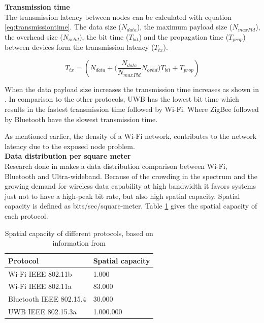 \documentclass[10pt,a4paper]{article}
\begin{document}
\textbf{\large Transmission time}\\
The transmission latency between nodes can be calculated with equation \ref{eq:transmissiontime}.\cite{comparitivestudywirelessprotocols} The data size ($N_{data}$), the maximum payload size ($N_{maxPld}$), the overhead size ($N_{ovhd}$), the bit time ($T_{bit}$) and the propagation time ($T_{prop}$) between devices form the transmission latency ($T_{tx}$). 

\begin{equation}
    T_{tx}=(N_{data} + \Bigg(\frac{N_{data}}{N_{maxPld}} N_{ovhd} \Bigg) T_{bit} + T_{prop})
    \label{eq:transmissiontime}
\end{equation}

When the data payload size increases the transmission time increases as shown in \cite{comparitivestudywirelessprotocols}. In comparison to the other protocols, UWB has the lowest bit time which results in the fastest transmission time followed by Wi-Fi. Where ZigBee followed by Bluetooth have the slowest transmission time.

As mentioned earlier, the density of a Wi-Fi network, contributes to the network latency due to the exposed node problem.\cite{combook} \\

\textbf{Data distribution per square meter}\\
Research done in \cite{ultrawidebandshortmediumrange} makes a data distribution comparison between Wi-Fi, Bluetooth and Ultra-wideband. Because of the crowding in the spectrum and the growing demand for wireless data capability at high bandwidth it favors systems just not to have a high-peak bit rate, but also high spatial capacity. Spatial capacity is defined as bits/sec/square-meter. \cite{ultrawidebandshortmediumrange} Table \ref{spatialcapacity} gives the spatial capacity of each protocol.

\begin{table}[H]
\centering
\caption{Spatial capacity of different protocols, based on information from \cite{ultrawidebandshortmediumrange}}
\label{spatialcapacity}
\begin{tabular}{|l|l|}
\hline
\textbf{Protocol}  & \textbf{Spatial capacity} \\ \hline
Wi-Fi IEEE 802.11b & 1.000                     \\ \hline
Wi-Fi IEEE 802.11a & 83.000                    \\ \hline
Bluetooth IEEE 802.15.4          & 30.000                    \\ \hline
UWB IEEE 802.15.3a                & 1.000.000                 \\ \hline
\end{tabular}
\end{table}
\end{document}
